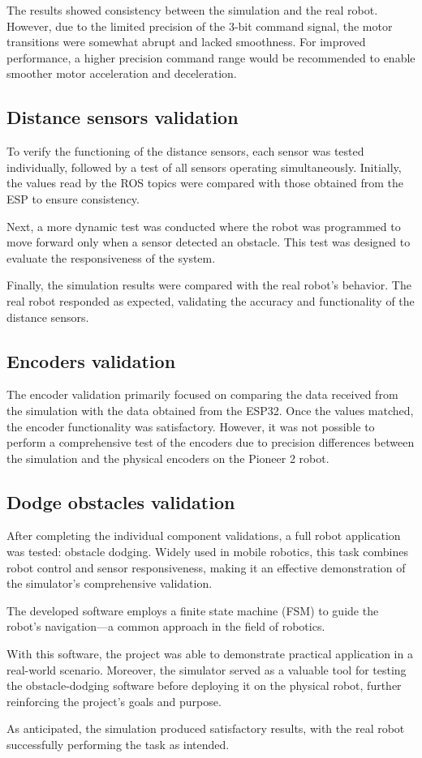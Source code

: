 \documentclass[../../monografia.tex]{subfiles}
\begin{document}
The results showed consistency between the simulation and the real robot. However, due to the limited precision of the 3-bit command signal, the motor transitions were somewhat abrupt and lacked smoothness. For improved performance, a higher precision command range would be recommended to enable smoother motor acceleration and deceleration.

\subsection{Distance sensors validation}

 To verify the functioning of the distance sensors, each sensor was tested individually, followed by a test of all sensors operating simultaneously. Initially, the values read by the ROS topics were compared with those obtained from the ESP to ensure consistency.

Next, a more dynamic test was conducted where the robot was programmed to move forward only when a sensor detected an obstacle. This test was designed to evaluate the responsiveness of the system.

Finally, the simulation results were compared with the real robot's behavior. The real robot responded as expected, validating the accuracy and functionality of the distance sensors.

 \subsection{Encoders validation}

The encoder validation primarily focused on comparing the data received from the simulation with the data obtained from the ESP32. Once the values matched, the encoder functionality was satisfactory. However, it was not possible to perform a comprehensive test of the encoders due to precision differences between the simulation and the physical encoders on the Pioneer 2 robot.

\subsection{Dodge obstacles validation}

After completing the individual component validations, a full robot application was tested: obstacle dodging. Widely used in mobile robotics, this task combines robot control and sensor responsiveness, making it an effective demonstration of the simulator's comprehensive validation.

The developed software employs a finite state machine (FSM) to guide the robot's navigation—a common approach in the field of robotics.

With this software, the project was able to demonstrate practical application in a real-world scenario. Moreover, the simulator served as a valuable tool for testing the obstacle-dodging software before deploying it on the physical robot, further reinforcing the project's goals and purpose.

As anticipated, the simulation produced satisfactory results, with the real robot successfully performing the task as intended.
\end{document}
